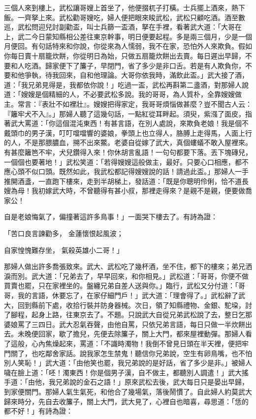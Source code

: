 \begin{showcontents}{}
三個人來到樓上，武松讓哥嫂上首坐了，他便掇杌子打橫。士兵擺上酒來，熱下飯。一齊拏上來。武松勸哥嫂吃，婦人便把眼來睃武松，武松只顧吃酒。酒至數巡，武松問迎兒討副勸盃，叫士兵篩一盃酒，拏在手裡，看著武大道：「大哥在上，武二今日蒙知縣相公差往東京幹事，明日便要起程。多是兩三個月，少是一個月便回。有句話特來和你說，你從來為人懦弱，我不在家，恐怕外人來欺負。假如你每日賣十扇籠炊餅，你從明日為始，只做五扇籠炊餅出去賣。每日遲出早歸，不要和人吃酒。歸家便下了簾子，早閉門，省了多少是非口舌。若是有人欺負你，不要和他爭執，待我回來，自和他理論。大哥你依我時，滿飲此盃。」武大接了酒，道：「我兄弟見得是，我都依你說！」吃過一盃，武松再斟第二盞酒，對那婦人說道：「嫂嫂是個精細的人，不必要武松多說。我的哥哥，為人質朴，全靠嫂嫂做主。常言：『表壯不如裡壯』。嫂嫂把得家定，我哥哥煩惱做甚麼？豈不聞古人云：『籬牢犬不入』。」那婦人聽了這幾句話，一點紅從耳畔起。須臾，紫漒了面皮，指著武大罵道：「你這個混沌東西！有甚言語，在別人處說，來欺負老娘！我是個不戴頭巾的男子漢，叮叮噹噹響的婆娘，拳頭上也立得人，胳膊上走得馬，人面上行的人，不是那腲膿血，搠不出來鱉。老婆自從嫁了武大，真個螻蟻不敢入屋裡來。有甚麼籬笆不牢，犬兒鑽得入來！你休胡言亂語！一句句都要下落。丟下塊磚兒，一個個也要著地！」武松笑道：「若得嫂嫂這般做主，最好。只要心口相應，都不應心頭不似口頭。既然如此，我武松都記得嫂嫂說的話！請過此盃。」那婦人一手推開酒盞，一直跑下樓來，走到半胡梯上，發話道：「既是你聰明伶俐，恰不道長嫂為母！我初嫁武大時，不曾聽得有甚小叔，那裡走得來？是親不是親，便要做喬家公！

自是老娘悔氣了，偏撞著這許多鳥事！」一面哭下樓去了。有詩為證：

「苦口良言諫勸多，  金蓮懷恨起風波；

自家惶愧難存坐，  氣殺英雄小二哥！」

那婦人做出許多喬張致來。武大、武松吃了幾杯酒，坐不住，都下的樓來；弟兄洒淚而別。武大道：「兄弟去了，早早回來，和你相見。」武松道：「哥哥，你便不做買賣也罷，只在家裡坐的。盤纏兄弟自差人送與你。」臨行，武松又分付道：「哥哥，我的言語，休要忘了，在家仔細門戶！」武大道：「理會得了。」武松辭了武大，回到縣前下處，收拾行裝并防身器械。次日，領了知縣禮物、金銀、駝垜，討了腳程，起身上路，往東京去了。不題。只說武大自從兄弟武松說了去，整日乞那婆娘罵了三四日。武大忍氣吞聲，由他自罵，只依兄弟言語，每日只做一半炊餅出去。未晚便回家，歇了擔兒，先便去除簾子，關上大門，都來屋裡動彈。那婦人看了這般，心內焦燥起來，罵道：「不識時濁物！我倒不曾見日頭在半天裡，便把牢門關了，也吃鄰舍家話。說我家怎生禁鬼！聽信你兄弟說，空生有卵鳥嘴，也不怕別人笑恥！」武大道：「由他笑也罷，我兄弟說的是好話，省了多少是非。」被婦人噦在臉上道：「呸！濁東西！你是個男子漢，自不做主，都聽別人調遣！」武大搖手道：「由他，我兄弟說的金石之語！」原來武松去後，武大每日只是晏出早歸，到家便關門。那婦人氣生氣死，和他合了幾場氣，落後鬧慣了。自此婦人約莫武大歸來時分，先自去收簾子，關上大門，武大見了，心裡自也暗喜，尋思道：「恁的都不好！」有詩為證：


\end{showcontents}
